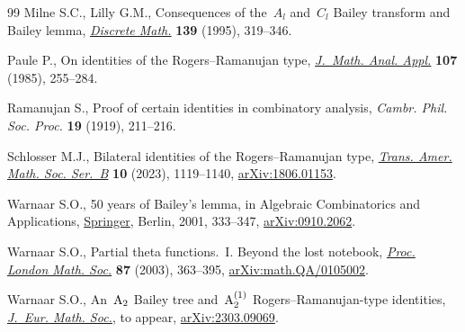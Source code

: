 \documentclass[pdftex]{sigma}
\numberwithin{equation}{section}
\begin{document}
\begin{thebibliography}{99}
Milne S.C., Lilly G.M., Consequences of the~{$A_l$} and~{$C_l$} {B}ailey
 transform and {B}ailey lemma, \href{https://doi.org/10.1016/0012-365X(94)00139-A}{\textit{Discrete Math.}} \textbf{139} (1995),
 319--346.

Paule P., On identities of the {R}ogers--{R}amanujan type, \href{https://doi.org/10.1016/0022-247X(85)90368-3}{\textit{J.~Math.
 Anal. Appl.}} \textbf{107} (1985), 255--284.

Ramanujan S., Proof of certain identities in combinatory analysis,
 \textit{Cambr. Phil. Soc. Proc.} \textbf{19} (1919), 211--216.

Schlosser M.J., Bilateral identities of the {R}ogers--{R}amanujan type,
 \href{https://doi.org/10.1090/btran/158}{\textit{Trans. Amer. Math. Soc. Ser.~B}} \textbf{10} (2023), 1119--1140,
 \href{https://arxiv.org/abs/1806.01153}{arXiv:1806.01153}.

Warnaar S.O., 50 years of {B}ailey's lemma, in Algebraic {C}ombinatorics and
 {A}pplications, \href{https://doi.org/10.1007/978-3-642-59448-9_23}{Springer}, Berlin, 2001, 333--347, \href{https://arxiv.org/abs/0910.2062}{arXiv:0910.2062}.

Warnaar S.O., Partial theta functions.~{I}. {B}eyond the lost notebook,
 \href{https://doi.org/10.1112/S002461150201403X}{\textit{Proc. London Math. Soc.}} \textbf{87} (2003), 363--395,
 \href{https://arxiv.org/abs/math.QA/0105002}{arXiv:math.QA/0105002}.

Warnaar S.O., An~${\rm A}_2$ Bailey tree and~${\rm A}_2^{(1)}$
 Rogers--Ramanujan-type identities, \href{https://doi.org/10.4171/JEMS/1627}{\textit{J.~Eur. Math. Soc.}}, {t}o appear,
 \href{https://arxiv.org/abs/2303.09069}{arXiv:2303.09069}.

\end{thebibliography}\LastPageEnding
\end{document}
